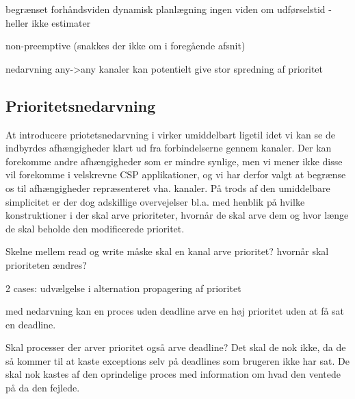 
begrænset forhåndsviden 
  dynamisk planlægning
  ingen viden om udførselstid - heller ikke estimater  

non-preemptive (snakkes der ikke om i foregående afsnit)

nedarvning 
  any->any kanaler kan potentielt give stor spredning af prioritet

\subsection{Prioritetsnedarvning}
At introducere priotetsnedarvning i \pycsp virker umiddelbart ligetil idet vi kan se de indbyrdes afhængigheder klart ud fra forbindelserne gennem kanaler. Der kan forekomme andre afhængigheder som er mindre synlige, men vi mener ikke disse vil forekomme i velskrevne CSP applikationer, og vi har derfor valgt at begrænse os til afhængigheder repræsenteret vha. kanaler. På trods af den umiddelbare simplicitet er der dog adskillige overvejelser bl.a. med henblik på hvilke konstruktioner i \pycsp der skal arve prioriteter, hvornår de skal arve dem og hvor længe de skal beholde den modificerede prioritet. 




Skelne mellem read og write
måske skal en kanal arve prioritet?
hvornår skal prioriteten ændres? 

2 cases:
udvælgelse i alternation
propagering af prioritet

med nedarvning kan en proces uden deadline arve en høj prioritet uden at få sat en deadline. 

Skal processer der arver prioritet også arve deadline? Det skal de nok ikke, da de så kommer til at kaste exceptions selv på deadlines som brugeren ikke har sat. De skal nok kastes af den oprindelige proces med information om hvad den ventede på da den fejlede. 

